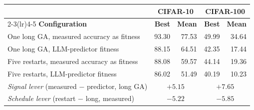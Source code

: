 \begin{tabular}{l rr rr}
\toprule
& \multicolumn{2}{c}{CIFAR-10} & \multicolumn{2}{c}{CIFAR-100} \\
\cmidrule(lr){2-3}\cmidrule(lr){4-5}
\textbf{Configuration} & \textbf{Best} & \textbf{Mean} & \textbf{Best} & \textbf{Mean} \\
\midrule
One long GA, measured accuracy as fitness & 93.30 & 77.53 & 49.99 & 34.64 \\
One long GA, LLM-predictor fitness & 88.15 & 64.51 & 42.35 & 17.44 \\
Five restarts, measured accuracy as fitness & 88.08 & 59.57 & 44.14 & 19.36 \\
Five restarts, LLM-predictor fitness & 86.02 & 51.49 & 40.19 & 10.23 \\
\midrule
\textit{Signal lever} (measured $-$ predictor, long GA) & \multicolumn{2}{c}{$+5.15$} & \multicolumn{2}{c}{$+7.65$} \\
\textit{Schedule lever} (restart $-$ long, measured) & \multicolumn{2}{c}{$-5.22$} & \multicolumn{2}{c}{$-5.85$} \\
\bottomrule
\end{tabular}
